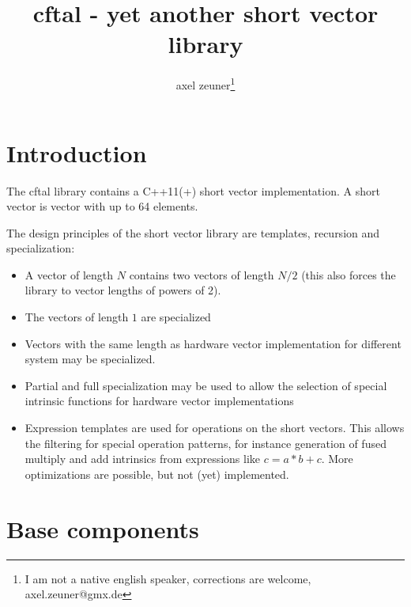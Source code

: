 \documentclass[10pt,a4paper,draft]{article}
\numberwithin{equation}{subsection}
\begin{document}
\title{cftal - yet another short vector library}
\author{axel zeuner\footnote{I am not a native english speaker, corrections are welcome, axel.zeuner@gmx.de}}
\maketitle

\tableofcontents

\section{Introduction}
\label{sec:introduction}

The cftal library contains a C++11(+) short vector implementation. A
short vector is vector with up to 64 elements.

The design principles of the short vector library are
templates, recursion and specialization:
\begin{itemize}
\item A vector of length $N$ contains two vectors of length $N/2$
  (this also forces the library to vector lengths of powers of 2).
\item The vectors of length $1$ are specialized
\item Vectors with the same length as hardware vector implementation
  for different system may be specialized.
\item Partial and full specialization may be used to allow the
  selection of special intrinsic functions for hardware vector
  implementations
\item Expression templates are used for operations on the short
  vectors. This allows the filtering for special operation patterns,
  for instance generation of fused multiply and add intrinsics from
  expressions like $ c= a* b + c $. More optimizations are possible,
  but not (yet) implemented.
\end{itemize}

\section{Base components}
\label{sec:base}
\end{document}

